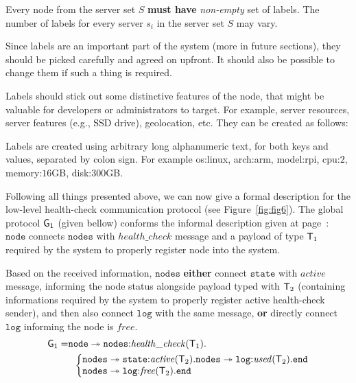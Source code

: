 \begin{definition}
	Every node from the server set $S$ \textbf{must have} \emph{non-empty} set of labels. The number of labels for every server $s_i$ in the server set $S$ may vary.
\end{definition}

\noindent
Since labels are an important part of the system (more in future sections), they should be picked carefully and agreed on upfront. It should also be possible to change them if such a thing is required. 

Labels should stick out some distinctive features of the node, that might be valuable for developers or administrators to target. For example, server resources, server features (e.g., SSD drive), geolocation, etc. They can be created as follows:

\begin{definition}
	Labels are created using arbitrary long alphanumeric text, for both keys and values, separated by colon sign. For example os:linux, arch:arm, model:rpi, cpu:$2$, memory:$16$GB, disk:$300$GB.
\end{definition}

\noindent
Following all things presented above, we can now give a formal description for the low-level health-check communication protocol (see Figure~\ref{fig:fig6}). The global protocol ${\sf G}_1$ (given bellow) conforms the informal description given at page~\pageref{informal_description_health-check}: $\mathtt{node}$ connects $\mathtt{nodes}$ with $\mathit{health{\_}check}$ message and a payload of type ${\mathsf T}_1$ required by the system to properly register node into the system. 

Based on the received information, $\mathtt{nodes}$ {\bf either} connect $\mathtt{state}$ with $\mathit{active}$ message, informing the node status alongside payload typed with ${\mathsf T}_2$ (containing informations required by the system to properly register active health-check sender), and then also connect $\mathtt{log}$ with the same message, {\bf or} directly connect $\mathtt{log}$ informing the node is $\mathit{free}$.
\begin{align*}
\G_1 = & 
\mathtt{node} \twoheadrightarrow \mathtt{nodes}{:}\mathit{health{\_}check}(\T_1).\\
& \hspace{2mm}
\left\{
\begin{array}{@{}l@{}}
\mathtt{nodes} \twoheadrightarrow \mathtt{state}{:}\mathit{active}(\T_2).\mathtt{nodes}\twoheadrightarrow \mathtt{log}{:}\mathit{used}(\T_2).\tend\\
\mathtt{nodes}\twoheadrightarrow \mathtt{log}{:}\mathit{free}(\T_2).\tend
\end{array} \right.
\end{align*}


